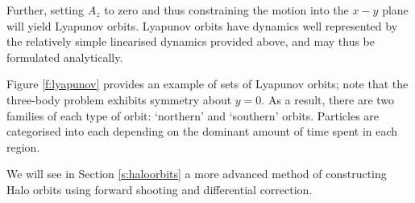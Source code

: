 Further, setting $A_z$ to zero and thus constraining the motion into the $x-y$ plane will yield Lyapunov orbits. Lyapunov orbits have dynamics well represented by the relatively simple linearised dynamics provided above, and may thus be formulated analytically.

Figure \ref{f:lyapunov} provides an example of sets of Lyapunov orbits; note that the three-body problem exhibits symmetry about $y=0$. As a result, there are two families of each type of orbit: `northern' and `southern' orbits. Particles are categorised into each depending on the dominant amount of time spent in each region.

We will see in Section \ref{s:haloorbits} a more advanced method of constructing Halo orbits using forward shooting and differential correction.

